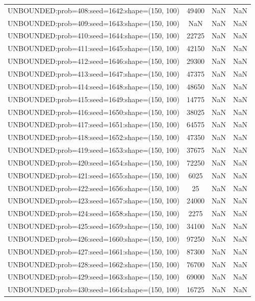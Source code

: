 \begin{longtable}{lccc}
UNBOUNDED:prob=408:seed=1642:shape=(150, 100) & 49400 &   NaN &    NaN \\
UNBOUNDED:prob=409:seed=1643:shape=(150, 100) &   NaN &   NaN &    NaN \\
UNBOUNDED:prob=410:seed=1644:shape=(150, 100) & 22725 &   NaN &    NaN \\
UNBOUNDED:prob=411:seed=1645:shape=(150, 100) & 42150 &   NaN &    NaN \\
UNBOUNDED:prob=412:seed=1646:shape=(150, 100) & 29300 &   NaN &    NaN \\
UNBOUNDED:prob=413:seed=1647:shape=(150, 100) & 47375 &   NaN &    NaN \\
UNBOUNDED:prob=414:seed=1648:shape=(150, 100) & 48650 &   NaN &    NaN \\
UNBOUNDED:prob=415:seed=1649:shape=(150, 100) & 14775 &   NaN &    NaN \\
UNBOUNDED:prob=416:seed=1650:shape=(150, 100) & 38025 &   NaN &    NaN \\
UNBOUNDED:prob=417:seed=1651:shape=(150, 100) & 64575 &   NaN &    NaN \\
UNBOUNDED:prob=418:seed=1652:shape=(150, 100) & 47350 &   NaN &    NaN \\
UNBOUNDED:prob=419:seed=1653:shape=(150, 100) & 37675 &   NaN &    NaN \\
UNBOUNDED:prob=420:seed=1654:shape=(150, 100) & 72250 &   NaN &    NaN \\
UNBOUNDED:prob=421:seed=1655:shape=(150, 100) &  6025 &   NaN &    NaN \\
UNBOUNDED:prob=422:seed=1656:shape=(150, 100) &    25 &   NaN &    NaN \\
UNBOUNDED:prob=423:seed=1657:shape=(150, 100) & 24000 &   NaN &    NaN \\
UNBOUNDED:prob=424:seed=1658:shape=(150, 100) &  2275 &   NaN &    NaN \\
UNBOUNDED:prob=425:seed=1659:shape=(150, 100) & 34100 &   NaN &    NaN \\
UNBOUNDED:prob=426:seed=1660:shape=(150, 100) & 97250 &   NaN &    NaN \\
UNBOUNDED:prob=427:seed=1661:shape=(150, 100) & 87300 &   NaN &    NaN \\
UNBOUNDED:prob=428:seed=1662:shape=(150, 100) & 76700 &   NaN &    NaN \\
UNBOUNDED:prob=429:seed=1663:shape=(150, 100) & 69000 &   NaN &    NaN \\
UNBOUNDED:prob=430:seed=1664:shape=(150, 100) & 16725 &   NaN &    NaN \\

\end{longtable}
